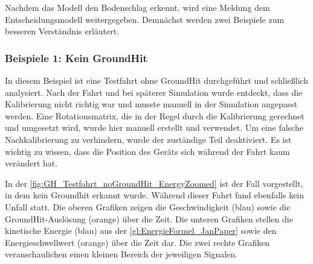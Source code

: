 Nachdem das Modell den Bodenschlag erkennt, wird eine Meldung dem Entscheidungsmodell weitergegeben. Demnächst werden zwei Beispiele zum besseren Verständnis erläutert.

\subsubsection{Beispiele 1: Kein GroundHit}
In diesem Beispiel ist eine Testfahrt ohne GroundHit durchgeführt und schließlich analysiert. Nach der Fahrt und bei späterer Simulation wurde entdeckt, dass die Kalibrierung nicht richtig war und musste manuell in der Simulation angepasst werden. Eine Rotationsmatrix, die in der Regel durch die Kalibrierung gerechnet und umgesetzt wird, wurde hier manuell erstellt und verwendet. Um eine falsche Nachkalibrierung zu verhindern, wurde der zuständige Teil deaktiviert. Es ist wichtig zu wissen, dass die Position des Geräts sich während der Fahrt kaum verändert hat.



In der \autoref{fig:GH_Testfahrt_noGroundHit_EnergyZoomed} ist der Fall vorgestellt, in dem kein Groundhit erkannt wurde. Während dieser Fahrt fand ebenfalls kein Unfall statt. 
Die oberen Grafiken zeigen die Geschwindigkeit (blau) sowie die GroundHit-Auslösung (orange) über die Zeit.
Die unteren Grafiken stellen die kinetische Energie (blau) aus der \autoref{gl:EnergieFormel_JanPaper} sowie den Energieschwellwert (orange) über die Zeit dar.
Die zwei rechte Grafiken veranschaulichen einen kleinen Bereich der jeweiligen Signalen.

